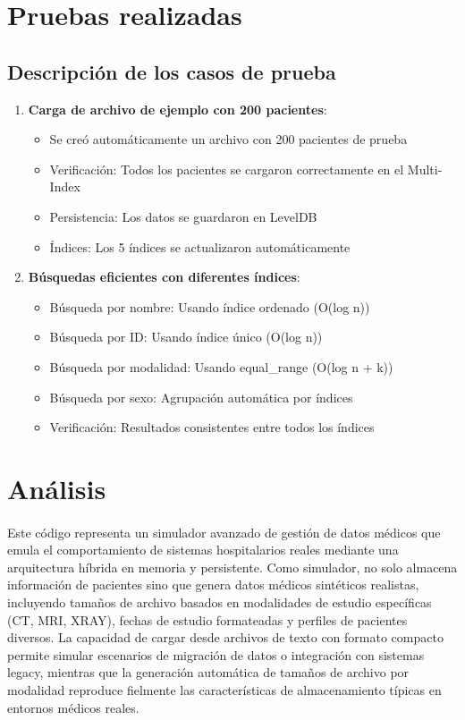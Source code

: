 \documentclass[12pt]{article}
\begin{document}
	\section{Pruebas realizadas}
	
	\subsection*{Descripción de los casos de prueba}
	
	\begin{enumerate}
		\item \textbf{Carga de archivo de ejemplo con 200 pacientes}:
		\begin{itemize}
			\item Se creó automáticamente un archivo con 200 pacientes de prueba
			\item Verificación: Todos los pacientes se cargaron correctamente en el Multi-Index
			\item Persistencia: Los datos se guardaron en LevelDB
			\item Índices: Los 5 índices se actualizaron automáticamente
		\end{itemize}
		
		\item \textbf{Búsquedas eficientes con diferentes índices}:
		\begin{itemize}
			\item Búsqueda por nombre: Usando índice ordenado (O(log n))
			\item Búsqueda por ID: Usando índice único (O(log n)) 
			\item Búsqueda por modalidad: Usando equal\_range (O(log n + k))
			\item Búsqueda por sexo: Agrupación automática por índices
			\item Verificación: Resultados consistentes entre todos los índices
		\end{itemize}
	\end{enumerate}
	
	\section{Análisis}
	
	\paragraph*{}
	Este código representa un simulador avanzado de gestión de datos médicos que emula el comportamiento de sistemas hospitalarios reales mediante una arquitectura híbrida en memoria y persistente. Como simulador, no solo almacena información de pacientes sino que genera datos médicos sintéticos realistas, incluyendo tamaños de archivo basados en modalidades de estudio específicas (CT, MRI, XRAY), fechas de estudio formateadas y perfiles de pacientes diversos. La capacidad de cargar desde archivos de texto con formato compacto permite simular escenarios de migración de datos o integración con sistemas legacy, mientras que la generación automática de tamaños de archivo por modalidad reproduce fielmente las características de almacenamiento típicas en entornos médicos reales.
	
\end{document}
